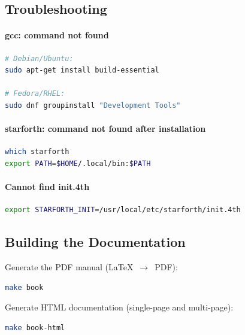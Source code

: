 \subsection{Troubleshooting}
\label{sec:install-trouble}

\paragraph{gcc: command not found}

\begin{lstlisting}[language=bash]
# Debian/Ubuntu:
sudo apt-get install build-essential

# Fedora/RHEL:
sudo dnf groupinstall "Development Tools"
\end{lstlisting}

\paragraph{starforth: command not found after installation}

\begin{lstlisting}[language=bash]
which starforth
export PATH=$HOME/.local/bin:$PATH
\end{lstlisting}

\paragraph{Cannot find init.4th}

\begin{lstlisting}[language=bash]
export STARFORTH_INIT=/usr/local/etc/starforth/init.4th
\end{lstlisting}

\subsection{Building the Documentation}
\label{sec:install-docs}

Generate the PDF manual (LaTeX~$\to$~PDF):

\begin{lstlisting}[language=bash]
make book
\end{lstlisting}

Generate HTML documentation (single-page and multi-page):

\begin{lstlisting}[language=bash]
make book-html
\end{lstlisting}
